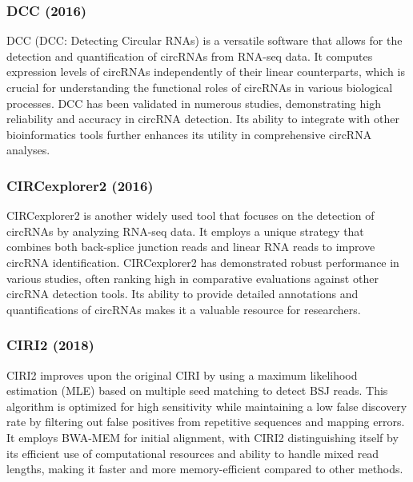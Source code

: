 \subsubsection{DCC (2016)\supercite{cheng_specific_2016}}
DCC (DCC: Detecting Circular RNAs) is a versatile software that allows for the
detection and quantification of circRNAs from RNA-seq data.
It computes expression levels of circRNAs independently of their linear
counterparts, which is crucial for understanding the functional roles of
circRNAs in various biological
processes\supercite{jakobi_profiling_2016,man_profiling_2020}.
DCC has been validated in numerous studies, demonstrating high reliability and
accuracy in circRNA detection\supercite{paraboschi_interpreting_2018}.
Its ability to integrate with other bioinformatics tools further enhances its
utility in comprehensive circRNA analyses.

\subsubsection{CIRCexplorer2 (2016)\supercite{zhang_diverse_2016}}
CIRCexplorer2 is another widely used tool that focuses on the detection of
circRNAs by analyzing RNA-seq data.
It employs a unique strategy that combines both back-splice junction reads and
linear RNA reads to improve circRNA identification.
CIRCexplorer2 has demonstrated robust performance in various studies, often
ranking high in comparative evaluations against other circRNA detection
tools\supercite{zeng_comprehensive_2017,nicolet_circular_2018}.
Its ability to provide detailed annotations and quantifications of circRNAs
makes it a valuable resource for researchers\supercite{hansen_comparison_2016}.

\subsubsection{CIRI2 (2018)\supercite{gao_circular_2018}}
CIRI2 improves upon the original CIRI\supercite{gao_ciri_2015} by using a
maximum likelihood estimation (MLE) based on multiple seed matching to detect
BSJ reads.
This algorithm is optimized for high sensitivity while maintaining a low false
discovery rate by filtering out false positives from repetitive sequences and
mapping errors.
It employs BWA-MEM for initial alignment, with CIRI2 distinguishing itself by
its efficient use of computational resources and ability to handle mixed read
lengths, making it faster and more memory-efficient compared to other
methods\supercite{gao_circular_2018}.
